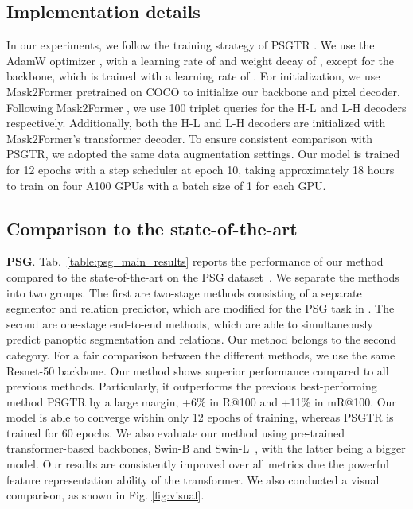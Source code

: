 \subsection{Implementation details}
\label{sec:experiments:implementation}
In our experiments, we follow the training strategy of PSGTR \cite{yang2022panoptic}.
We use the AdamW optimizer \cite{loshchilov2017decoupled}, with a learning rate of  and weight decay of , except for the backbone, which is trained with a learning rate of . For initialization, we use Mask2Former \cite{cheng2022masked} pretrained on COCO \cite{lin2014microsoft} to initialize our backbone and pixel decoder.
Following Mask2Former \cite{cheng2022masked}, we use 100 triplet queries for the H-L and L-H decoders respectively.
Additionally, both the H-L and L-H decoders are initialized with Mask2Former's transformer decoder.
To ensure consistent comparison with PSGTR, we adopted the same data augmentation settings.
Our model is trained for 12 epochs with a step scheduler at epoch 10, taking approximately 18 hours to train on four A100 GPUs with a batch size of 1 for each GPU.

\subsection{Comparison to the state-of-the-art}
\label{sec:experiments:main_results}

\noindent \textbf{PSG}. 
Tab.~\ref{table:psg_main_results} reports the performance of our method compared to the state-of-the-art on the PSG dataset~\cite{yang2022panoptic}.
We separate the methods into two groups. 
The first are two-stage methods consisting of a separate segmentor and relation predictor, which are modified for the PSG task in \cite{yang2022panoptic}.
The second are one-stage end-to-end methods, which are able to simultaneously predict panoptic segmentation and relations.
Our method belongs to the second category.
For a fair comparison between the different methods, we use the same Resnet-50 \cite{he2016deep} backbone.
Our method shows superior performance compared to all previous methods.
Particularly, it outperforms the previous best-performing method PSGTR \cite{yang2022panoptic} by a large margin, \ie +6\% in R@100 and +11\% in mR@100.
Our model is able to converge within only 12 epochs of training, whereas PSGTR \cite{yang2022panoptic} is trained for 60 epochs.
We also evaluate our method using pre-trained transformer-based backbones, \ie Swin-B and Swin-L~\cite{liu2021swin}, with the latter being a bigger model.
Our results are consistently improved over all metrics due the powerful feature representation ability of the transformer.
We also conducted a visual comparison, as shown in Fig. \ref{fig:visual}.

